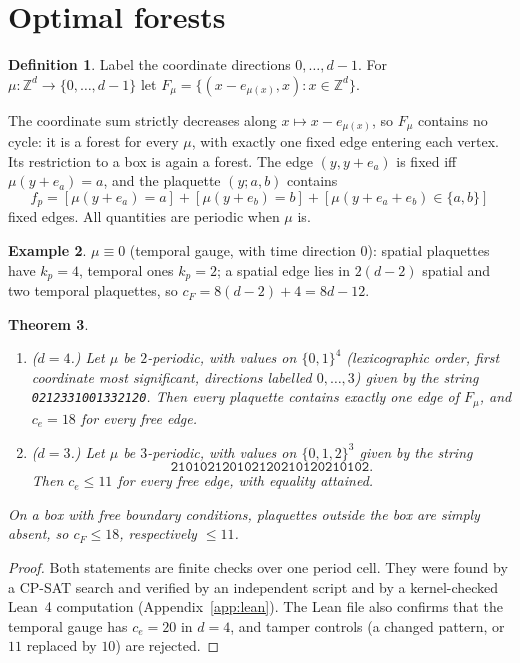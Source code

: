 \documentclass[11pt]{amsart}
\newtheorem{theorem}{Theorem}[section]
\theoremstyle{definition}
\newtheorem{definition}[theorem]{Definition}
\newtheorem{example}[theorem]{Example}
\theoremstyle{remark}
\begin{document}
\section{Optimal forests}

\begin{definition}
Label the coordinate directions $0,\dots,d-1$. For $\mu:\mathbb{Z}^d\to\{0,\dots,d-1\}$ let
$F_\mu=\{(x-e_{\mu(x)},x):x\in\mathbb{Z}^d\}$.
\end{definition}

The coordinate sum strictly decreases along $x\mapsto x-e_{\mu(x)}$, so $F_\mu$ contains no cycle: it is a forest for
every $\mu$, with exactly one fixed edge entering each vertex. Its restriction to a box is again a forest. The edge
$(y,y+e_a)$ is fixed iff $\mu(y+e_a)=a$, and the plaquette $(y;a,b)$ contains
\[
f_p=[\mu(y+e_a)=a]+[\mu(y+e_b)=b]+[\mu(y+e_a+e_b)\in\{a,b\}]
\]
fixed edges. All quantities are periodic when $\mu$ is.

\begin{example}\label{ex:temporal}
$\mu\equiv0$ (temporal gauge, with time direction $0$): spatial plaquettes have $k_p=4$, temporal ones $k_p=2$; a spatial edge lies in
$2(d-2)$ spatial and two temporal plaquettes, so $c_F=8(d-2)+4=8d-12$.
\end{example}

\begin{theorem}\label{thm:forests}
\begin{enumerate}
\item[(a)] ($d=4$.) Let $\mu$ be $2$-periodic, with values on $\{0,1\}^4$ (lexicographic order, first coordinate most
significant, directions labelled $0,\dots,3$) given by the string \texttt{0212331001332120}. Then every plaquette
contains exactly one edge of $F_\mu$, and $c_e=18$ for every free edge.
\item[(b)] ($d=3$.) Let $\mu$ be $3$-periodic, with values on $\{0,1,2\}^3$ given by the string
\[\texttt{210102120102120210120210102}.\] Then $c_e\le 11$ for every free edge, with equality attained.
\end{enumerate}
On a box with free boundary conditions, plaquettes outside the box are simply absent, so $c_F\le 18$, respectively
$\le 11$.
\end{theorem}

\begin{proof}
Both statements are finite checks over one period cell. They were found by a CP-SAT search and verified by an
independent script and by a kernel-checked Lean~4 computation (Appendix~\ref{app:lean}). The Lean file also confirms
that the temporal gauge has $c_e=20$ in $d=4$, and tamper controls (a changed pattern, or $11$ replaced by $10$) are
rejected.
\end{proof}
\end{document}
